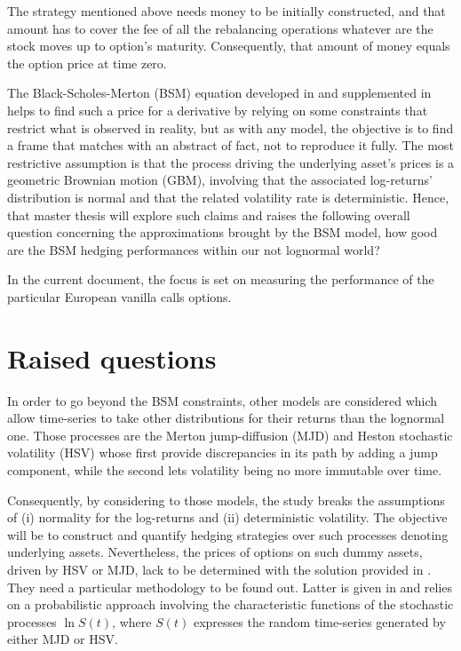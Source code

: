 \documentclass[12pt]{report}
\begin{document}
The strategy mentioned above needs money to be initially constructed, and that amount has to cover the fee of all the rebalancing operations whatever are the stock moves up to option's maturity.
Consequently, that amount of money equals the option price at time zero.

The Black-Scholes-Merton (BSM) equation developed in \citet{bs} and supplemented in \citet{merton73} helps to find such a price for a derivative by relying on some constraints that restrict what is observed in reality, but as with any model, the objective is to find a frame that matches with an abstract of fact, not to reproduce it fully.
The most restrictive assumption is that the process driving the underlying asset's prices is a geometric Brownian motion (GBM), involving that the associated log-returns' distribution is normal and that the related volatility rate is deterministic.
Hence, that master thesis will explore such claims and raises the following overall question concerning the approximations brought by the BSM model, how good are the BSM hedging performances within our not lognormal world?

In the current document, the focus is set on measuring the performance of the particular  European vanilla calls options.


\section{Raised questions}
\label{sec:Introduction:raised}

In order to go beyond the BSM constraints, other models are considered which allow time-series to take other distributions for their returns than the lognormal one.
Those processes are the Merton jump-diffusion (MJD) and Heston stochastic volatility (HSV) whose first provide discrepancies in its path by adding a jump component, while the second lets volatility being no more immutable over time.

Consequently, by considering to those models, the study breaks the assumptions of (i) normality for the log-returns and (ii) deterministic volatility.
The objective will be to construct and quantify hedging strategies over such processes denoting underlying assets.
Nevertheless, the prices of options on such dummy assets, driven by HSV or MJD, lack to be determined with the solution provided in \citet{bs}. 
They need a particular methodology to be found out. Latter is given in \citet{heston1993} and relies on a probabilistic approach involving the characteristic functions of the stochastic processes $\ln S(t)$, where $S(t)$ expresses the random time-series generated by either MJD or HSV.
\end{document}
